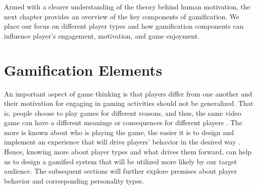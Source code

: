 Armed with a clearer understanding of the theory behind human motivation, the next chapter provides an overview of the key components of gamification. We place our focus on different player types and how gamification components can influence player's engagement, motivation, and game enjoyment. %
\chapter{Gamification Elements}
An important aspect of game thinking is that players differ from one another and their motivation for engaging in gaming activities should not be generalized. That is, people choose to play games for different reasons, and thus, the same video game can have a different meanings or consequences for different players \cite{yee2006motivations}. The more is known about who is playing the game, the easier it is to design and implement an experience that will drive players' behavior in the desired way \cite{zichermann2011gamification}. Hence, knowing more about player types and what drives them forward, can help us to design a gamified system that will be utilized more likely by our target audience. The subsequent sections will further explore premises about player behavior and corresponding personality types.
